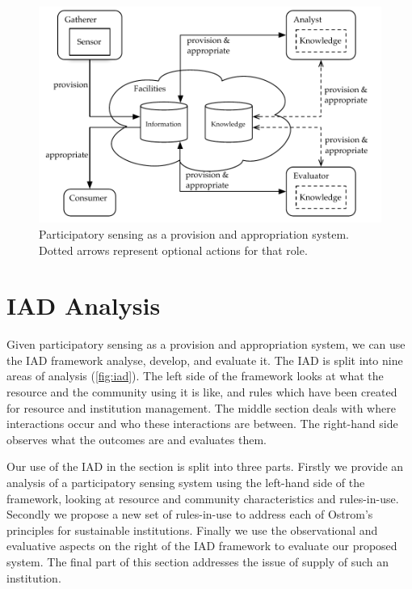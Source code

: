 \begin{figure}
\includegraphics[width=\linewidth]{gfx/Prov_and_app_sys_diag}
\caption[Participatory sensing as a provision and appropriation system]{Participatory sensing as a provision and appropriation system. Dotted arrows represent optional actions for that role.}\label{fig:psys}
\end{figure}

\section{IAD Analysis}

Given participatory sensing as a provision and appropriation system, we can use the \ac{IAD} framework analyse, develop, and evaluate it. 
The \ac{IAD} is split into nine areas of analysis (\autoref{fig:iad}). 
The left side of the framework looks at what the resource and the community using it is like, and rules which have been created for resource and institution management. 
The middle section deals with where interactions occur and who these interactions are between. 
The right-hand side observes what the outcomes are and evaluates them.

Our use of the \ac{IAD} in the section is split into three parts.
Firstly we provide an analysis of a participatory sensing system using the left-hand side of the framework, looking at resource and community characteristics and rules-in-use. 
Secondly we propose a new set of rules-in-use to address each of Ostrom's principles for sustainable institutions. 
Finally we use the observational and evaluative aspects on the right of the \ac{IAD} framework to evaluate our proposed system.
The final part of this section addresses the issue of supply of such an institution.


